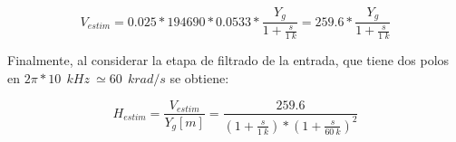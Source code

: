 \begin{equation}
	V_{estim}=0.025*194690*0.0533 * \frac{Y_{g}}{1 + \frac{s}{1\:k}}=259.6*\frac{Y_{g}}{1 + \frac{s}{1\:k}}	
\end{equation}

Finalmente, al considerar la etapa de filtrado de la entrada, que tiene dos polos en $2\pi *10\: \:{kHz}\ \simeq 60\: \:{krad/s}$ se obtiene:

\begin{equation} \label{eq_TLC_deriv_7}
	H_{estim}=\frac{V_{estim}}{Y_{g}[m]}=\frac{259.6}{(1+\frac{s}{1\:k})*{(1+\frac{s}{60\: k})}^2}
\end{equation}

